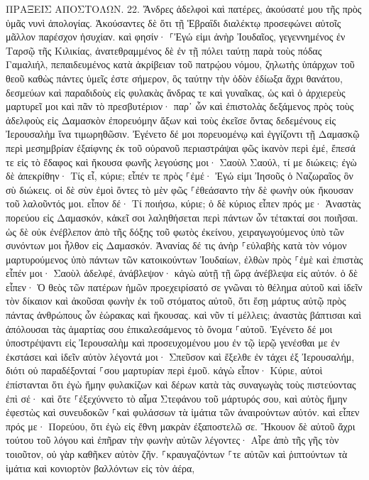 \documentclass[twoside, 9pt]{extreport}
\begin{document}
ΠΡΑΞΕΙΣ ΑΠΟΣΤΟΛΩΝ.
22.
Ἄνδρες ἀδελφοὶ καὶ πατέρες, ἀκούσατέ μου τῆς πρὸς ὑμᾶς νυνὶ ἀπολογίας. 
Ἀκούσαντες δὲ ὅτι τῇ Ἑβραΐδι διαλέκτῳ προσεφώνει αὐτοῖς μᾶλλον παρέσχον ἡσυχίαν. καὶ φησίν· 
⸀Ἐγώ εἰμι ἀνὴρ Ἰουδαῖος, γεγεννημένος ἐν Ταρσῷ τῆς Κιλικίας, ἀνατεθραμμένος δὲ ἐν τῇ πόλει ταύτῃ παρὰ τοὺς πόδας Γαμαλιήλ, πεπαιδευμένος κατὰ ἀκρίβειαν τοῦ πατρῴου νόμου, ζηλωτὴς ὑπάρχων τοῦ θεοῦ καθὼς πάντες ὑμεῖς ἐστε σήμερον, 
ὃς ταύτην τὴν ὁδὸν ἐδίωξα ἄχρι θανάτου, δεσμεύων καὶ παραδιδοὺς εἰς φυλακὰς ἄνδρας τε καὶ γυναῖκας, 
ὡς καὶ ὁ ἀρχιερεὺς μαρτυρεῖ μοι καὶ πᾶν τὸ πρεσβυτέριον· παρ᾽ ὧν καὶ ἐπιστολὰς δεξάμενος πρὸς τοὺς ἀδελφοὺς εἰς Δαμασκὸν ἐπορευόμην ἄξων καὶ τοὺς ἐκεῖσε ὄντας δεδεμένους εἰς Ἰερουσαλὴμ ἵνα τιμωρηθῶσιν. 
Ἐγένετο δέ μοι πορευομένῳ καὶ ἐγγίζοντι τῇ Δαμασκῷ περὶ μεσημβρίαν ἐξαίφνης ἐκ τοῦ οὐρανοῦ περιαστράψαι φῶς ἱκανὸν περὶ ἐμέ, 
ἔπεσά τε εἰς τὸ ἔδαφος καὶ ἤκουσα φωνῆς λεγούσης μοι· Σαοὺλ Σαούλ, τί με διώκεις; 
ἐγὼ δὲ ἀπεκρίθην· Τίς εἶ, κύριε; εἶπέν τε πρὸς ⸀ἐμέ· Ἐγώ εἰμι Ἰησοῦς ὁ Ναζωραῖος ὃν σὺ διώκεις. 
οἱ δὲ σὺν ἐμοὶ ὄντες τὸ μὲν φῶς ⸀ἐθεάσαντο τὴν δὲ φωνὴν οὐκ ἤκουσαν τοῦ λαλοῦντός μοι. 
εἶπον δέ· Τί ποιήσω, κύριε; ὁ δὲ κύριος εἶπεν πρός με· Ἀναστὰς πορεύου εἰς Δαμασκόν, κἀκεῖ σοι λαληθήσεται περὶ πάντων ὧν τέτακταί σοι ποιῆσαι. 
ὡς δὲ οὐκ ἐνέβλεπον ἀπὸ τῆς δόξης τοῦ φωτὸς ἐκείνου, χειραγωγούμενος ὑπὸ τῶν συνόντων μοι ἦλθον εἰς Δαμασκόν. 
Ἁνανίας δέ τις ἀνὴρ ⸀εὐλαβὴς κατὰ τὸν νόμον μαρτυρούμενος ὑπὸ πάντων τῶν κατοικούντων Ἰουδαίων, 
ἐλθὼν πρὸς ⸀ἐμὲ καὶ ἐπιστὰς εἶπέν μοι· Σαοὺλ ἀδελφέ, ἀνάβλεψον· κἀγὼ αὐτῇ τῇ ὥρᾳ ἀνέβλεψα εἰς αὐτόν. 
ὁ δὲ εἶπεν· Ὁ θεὸς τῶν πατέρων ἡμῶν προεχειρίσατό σε γνῶναι τὸ θέλημα αὐτοῦ καὶ ἰδεῖν τὸν δίκαιον καὶ ἀκοῦσαι φωνὴν ἐκ τοῦ στόματος αὐτοῦ, 
ὅτι ἔσῃ μάρτυς αὐτῷ πρὸς πάντας ἀνθρώπους ὧν ἑώρακας καὶ ἤκουσας. 
καὶ νῦν τί μέλλεις; ἀναστὰς βάπτισαι καὶ ἀπόλουσαι τὰς ἁμαρτίας σου ἐπικαλεσάμενος τὸ ὄνομα ⸀αὐτοῦ. 
Ἐγένετο δέ μοι ὑποστρέψαντι εἰς Ἰερουσαλὴμ καὶ προσευχομένου μου ἐν τῷ ἱερῷ γενέσθαι με ἐν ἐκστάσει 
καὶ ἰδεῖν αὐτὸν λέγοντά μοι· Σπεῦσον καὶ ἔξελθε ἐν τάχει ἐξ Ἰερουσαλήμ, διότι οὐ παραδέξονταί ⸀σου μαρτυρίαν περὶ ἐμοῦ. 
κἀγὼ εἶπον· Κύριε, αὐτοὶ ἐπίστανται ὅτι ἐγὼ ἤμην φυλακίζων καὶ δέρων κατὰ τὰς συναγωγὰς τοὺς πιστεύοντας ἐπὶ σέ· 
καὶ ὅτε ⸀ἐξεχύννετο τὸ αἷμα Στεφάνου τοῦ μάρτυρός σου, καὶ αὐτὸς ἤμην ἐφεστὼς καὶ συνευδοκῶν ⸀καὶ φυλάσσων τὰ ἱμάτια τῶν ἀναιρούντων αὐτόν. 
καὶ εἶπεν πρός με· Πορεύου, ὅτι ἐγὼ εἰς ἔθνη μακρὰν ἐξαποστελῶ σε. 
Ἤκουον δὲ αὐτοῦ ἄχρι τούτου τοῦ λόγου καὶ ἐπῆραν τὴν φωνὴν αὐτῶν λέγοντες· Αἶρε ἀπὸ τῆς γῆς τὸν τοιοῦτον, οὐ γὰρ καθῆκεν αὐτὸν ζῆν. 
⸀κραυγαζόντων ⸀τε αὐτῶν καὶ ῥιπτούντων τὰ ἱμάτια καὶ κονιορτὸν βαλλόντων εἰς τὸν ἀέρα, 
\end{document}
